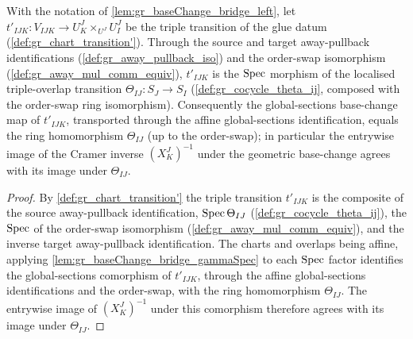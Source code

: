 \begin{lemma}\leanok
  \label{lem:gr_baseChange_bridge_transition}
  With the notation of \cref{lem:gr_baseChange_bridge_left}, let
  \(t'_{IJK} : V_{IJK} \to U^J_K \times_{U^J} U^J_I\) be the triple transition of the glue datum
  (\cref{def:gr_chart_transition'}). Through the source and target away-pullback identifications
  (\cref{def:gr_away_pullback_iso}) and the order-swap isomorphism
  (\cref{def:gr_away_mul_comm_equiv}), \(t'_{IJK}\) is the \(\operatorname{Spec}\) morphism of the localised
  triple-overlap transition \(\Theta_{IJ} : S_J \to S_I\) (\cref{def:gr_cocycle_theta_ij},
  composed with the order-swap ring isomorphism). Consequently the global-sections base-change
  map of \(t'_{IJK}\), transported through the affine global-sections identification, equals the
  ring homomorphism \(\Theta_{IJ}\) (up to the order-swap); in particular the entrywise image of
  the Cramer inverse \((X^J_K)^{-1}\) under the geometric base-change agrees with its image under
  \(\Theta_{IJ}\).
\end{lemma}
\begin{proof}
  By \cref{def:gr_chart_transition'} the triple transition \(t'_{IJK}\) is the composite of the
  source away-pullback identification, \(\operatorname{Spec}\Theta_{IJ}\) (\cref{def:gr_cocycle_theta_ij}), the
  \(\operatorname{Spec}\) of the order-swap isomorphism (\cref{def:gr_away_mul_comm_equiv}), and the inverse
  target away-pullback identification. The charts and overlaps being affine, applying
  \cref{lem:gr_baseChange_bridge_gammaSpec} to each \(\operatorname{Spec}\) factor identifies the global-sections
  comorphism of \(t'_{IJK}\), through the affine global-sections identifications and the order-swap,
  with the ring homomorphism \(\Theta_{IJ}\). The entrywise image of \((X^J_K)^{-1}\) under this
  comorphism therefore agrees with its image under \(\Theta_{IJ}\).
\end{proof}

